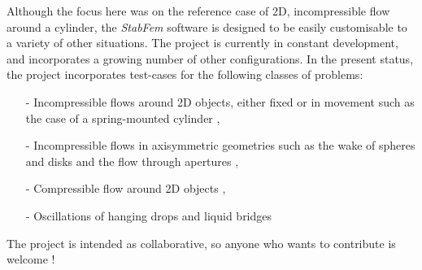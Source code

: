 \documentclass[twocolumn,10pt]{asme2ej}
\begin{document}
Although the focus here was on the reference case of 2D, incompressible flow around a cylinder, the  {\em StabFem } software is designed to be easily customisable to a variety of other situations. The project is currently in constant development, and incorporates a growing number of other configurations. In the present status, the project incorporates test-cases for the following classes of problems:
\begin{itemize}
\item[-] Incompressible flows around 2D objects, either fixed or in movement such as the case of a spring-mounted cylinder \cite{Navrose},
\item[-] Incompressible flows in axisymmetric geometries such as the wake of spheres and disks \cite{Tchoufag2015} and the flow through apertures \cite{FabreISMA}, 
\item[-] Compressible flow around 2D objects  \cite{Fani2018}, 
\item[-] Oscillations of hanging drops and liquid bridges \cite{Chireux2015}
\end{itemize}
The project is intended as collaborative, so anyone who wants to contribute is welcome !








\appendix








\end{document}

